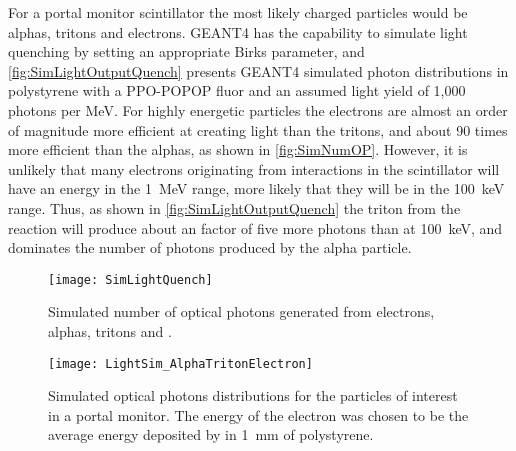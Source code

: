 For a portal monitor scintillator the most likely charged particles would be alphas, tritons and electrons.
GEANT4 has the capability to simulate light quenching by setting an appropriate Birks parameter, and \autoref{fig:SimLightOutputQuench} presents GEANT4 simulated photon distributions in polystyrene with a PPO-POPOP fluor and an assumed light yield of 1,000 photons per MeV.
For highly energetic particles the electrons are almost an order of magnitude more efficient at creating light than the tritons, and about 90 times more efficient than the alphas, as shown in \autoref{fig:SimNumOP}.
However, it is unlikely that many electrons originating from  interactions in the scintillator will have an energy in the \SI{1}{\MeV} range, more likely that they will be in the \SI{100}{\keV} range.
Thus, as shown in \autoref{fig:SimLightOutputQuench} the triton from the  reaction will produce about an factor of five more photons than at \SI{100}{\keV}, and dominates the number of photons produced by the alpha particle.
\begin{figure}
  \centering
    \texttt{[image: SimLightQuench]}
    \caption[Simulated Number of Optical Photons for Various Ions and Energies]{Simulated number of optical photons generated from electrons, alphas, tritons and .\LightQuenchSimGeo}
	\label{fig:SimNumOP}
  \end{figure}
  \begin{figure}
	\centering
    \texttt{[image: LightSim\_AlphaTritonElectron]}
  \caption[GEANT4 simulated light output of alpha, tritons and electrons in polystyrene]{Simulated optical photons distributions for the particles of interest in a portal monitor.  The energy of the electron was chosen to be the average energy deposited by  in \SI{1}{\mm} of polystyrene. \LightQuenchSimGeo}
  \label{fig:SimLightOutputQuench}
\end{figure}

